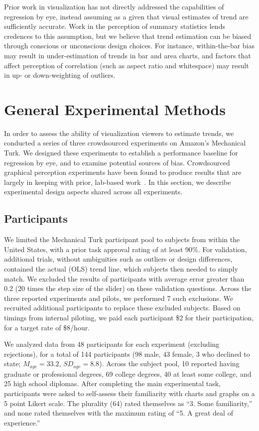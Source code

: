 \documentclass{sigchi}
\begin{document}
Prior work in visualization has not directly addressed the capabilities of regression by eye, instead assuming as a given that visual estimates of trend are sufficiently accurate. Work in the perception of summary statistics lends credences to this assumption, but we believe that trend estimation can be biased through conscious or unconscious design choices. For instance, within-the-bar bias may result in under-estimation of trends in bar and area charts, and factors that affect perception of correlation (such as aspect ratio and whitespace) may result in up- or down-weighting of outliers.

\section{General Experimental Methods}

\expFig

In order to assess the ability of visualization viewers to estimate trends, we conducted a series of three crowdsourced experiments on Amazon's Mechanical Turk. We designed these experiments to establish a performance baseline for regression by eye, and to examine potential sources of bias. Crowdsourced graphical perception experiments have been found to produce results that are largely in keeping with prior, lab-based work~\cite{heer2010crowdsourcing, talbot2014four}. In this section, we describe experimental design aspects shared across all experiments.

\subsection{Participants}

We limited the Mechanical Turk participant pool to subjects from within the United States, with a prior task approval rating of at least 90\%. For validation, additional trials, without ambiguities such as outliers or design differences, contained the actual (OLS) trend line, which subjects then needed to simply match.  We excluded the results of participants with average error greater than 0.2 (20 times the step size of the slider) on these validation questions. Across the three reported experiments and pilots, we performed 7 such exclusions. We recruited additional participants to replace these excluded subjects. Based on timings from internal piloting, we paid each participant \$2 for their participation, for a target rate of \$8/hour.

We analyzed data from 48 participants for each experiment (excluding rejections), for a total of 144 participants (98 male, 43 female, 3 who declined to state; $M_{age}= 33.2$, $SD_{age}=8.8$). Across the subject pool, 10 reported having graduate or professional degrees, 69 college degrees, 40 at least some college, and 25 high school diplomas. After completing the main experimental task, participants were asked to self-assess their familiarity with charts and graphs on a 5 point Likert scale. The plurality (64) rated themselves as ``3. Some familiarity,'' and none rated themselves with the maximum rating of ``5. A great deal of experience.''
\end{document}
